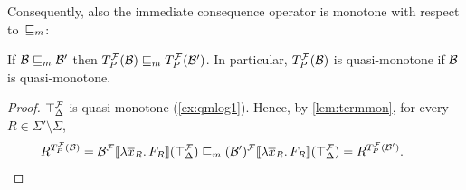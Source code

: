 \documentclass[a4paper,twoside,notitlepage,openright,11pt]{report}
\begin{document}
Consequently, also the immediate consequence operator is monotone with respect to~$\sqsubseteq_m$:
\begin{corollary}
  \label{cor:monimmcon}
  If $\mathcal B\sqsubseteq_m\mathcal B'$ then $T^\mathcal F_P(\mathcal B)\sqsubseteq_m T^\mathcal F_P(\mathcal B')$. In particular, $T^\mathcal F_P(\mathcal B)$ is quasi-monotone if $\mathcal B$ is quasi-monotone.
\end{corollary}
\begin{proof}
  $\top_\Delta^\mathcal F$ is quasi-monotone (\cref{ex:qmlog1}). Hence, by \cref{lem:termmon},
  for every $R\in\Sigma'\setminus\Sigma$,
  \begin{align*}
    R^{T^\mathcal F_P(\mathcal B)}={\mathcal B^\mathcal F}\llbracket\lambda\overline x_R\ldotp F_R\rrbracket(\top_\Delta^\mathcal F)\sqsubseteq_m{(\mathcal B')^\mathcal F}\llbracket\lambda\overline x_R\ldotp F_R\rrbracket(\top_\Delta^\mathcal F)=R^{T^\mathcal F_P(\mathcal B')}.&&&\qedhere
  \end{align*}
\end{proof}
\end{document}
